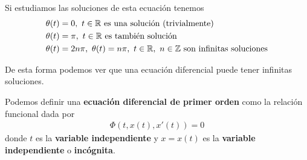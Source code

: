 Si estudiamos las soluciones de esta ecuación tenemos 
\begin{align*}
    \theta(t) &= 0, \ t\in \mathbb{R} \text{ es una solución (trivialmente)}\\
    \theta(t) & =\pi, \ t \in \mathbb{R} \text{ es también solución}\\
    \theta(t) & =2n\pi,\ \theta(t) =n\pi, \ t \in \mathbb{R},\ n \in \mathbb{Z} \text{ son infinitas soluciones}\\
\end{align*}

De esta forma podemos ver que una ecuación diferencial puede tener infinitas soluciones.

\begin{definicion}
    Podemos definir una \textbf{ecuación diferencial de primer orden} como la relación funcional dada por 
    \begin{gather*}
        \Phi (t, x(t), x'(t)) = 0
    \end{gather*}
    donde $t$ es la \textbf{variable independiente} y $x=x(t)$ es la \textbf{variable independiente} o \textbf{incógnita}.
\end{definicion}

